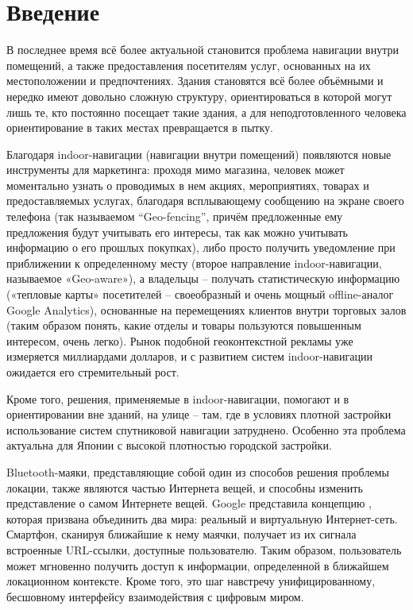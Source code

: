 \section*{Введение}

В последнее время всё более актуальной становится проблема навигации внутри помещений, а также предоставления посетителям услуг, основанных на их местоположении и предпочтениях. Здания становятся всё более объёмными и нередко имеют довольно сложную структуру, ориентироваться в которой могут лишь те, кто постоянно посещает такие здания, а для неподготовленного человека ориентирование в таких местах превращается в пытку.

Благодаря indoor-навигации (навигации внутри помещений) появляются новые инструменты для маркетинга: проходя мимо магазина, человек может моментально узнать о проводимых в нем акциях, мероприятиях, товарах и предоставляемых услугах, благодаря всплывающему сообщению на экране своего телефона (так называемом “Geo-fencing”, причём предложенные ему предложения будут учитывать его интересы, так как можно учитывать информацию о его прошлых покупках), либо просто получить уведомление при приближении к определенному месту (второе направление indoor-навигации, называемое «Geo-aware»), а владельцы – получать статистическую информацию («тепловые карты» посетителей – своеобразный и очень мощный offline-аналог Google Analytics), основанные на перемещениях клиентов внутри торговых залов (таким образом понять, какие отделы и товары пользуются повышенным интересом, очень легко). Рынок подобной геоконтекстной рекламы уже измеряется миллиардами долларов, и с развитием систем indoor-навигации ожидается его стремительный рост.

Кроме того, решения, применяемые в indoor-навигации, помогают и в ориентировании вне зданий, на улице – там, где в условиях плотной застройки использование систем спутниковой навигации затруднено. Особенно эта проблема актуальна для Японии с высокой плотностью городской застройки.

Bluetooth-маяки, представляющие собой один из способов решения проблемы локации, также являются частью Интернета вещей, и способны изменить представление о самом Интернете вещей. Google представила концепцию , которая призвана объединить два мира: реальный и виртуальную Интернет-сеть. Смартфон, сканируя ближайшие к нему маячки, получает из их сигнала встроенные URL-ссылки, доступные пользователю. Таким образом, пользователь может мгновенно получить доступ к информации, определенной в ближайшем локационном контексте. Кроме того, это шаг навстречу унифицированному, бесшовному интерфейсу взаимодействия с цифровым миром.

